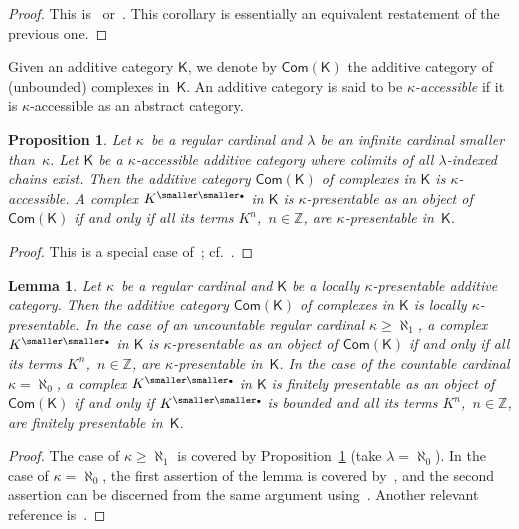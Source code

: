 \documentclass[12pt,a4paper]{amsart}
\newcommand{\+}{\protect\nobreakdash-}
\renewcommand{\:}{\colon}
\newcommand{\bu}{{\text{\smaller\smaller$\scriptstyle\bullet$}}}
\newcommand{\Com}{\mathsf{Com}}
\newcommand{\sK}{\mathsf K}
\newcommand{\boZ}{\mathbb Z}
\theoremstyle{plain}
\newtheorem{prop}[thm]{Proposition}
\newtheorem{lem}[thm]{Lemma}
\theoremstyle{definition}
\begin{document}
\begin{proof}
 This is~\cite[Remark~3.2(I), Theorem~3.8, Corollary~3.9, and
Remark~3.11(II)]{Ulm} or~\cite[Remark~5.2]{Pacc}.
 This corollary is essentially an equivalent restatement of
the previous one.
\end{proof}

 Given an additive category $\sK$, we denote by $\Com(\sK)$
the additive category of (unbounded) complexes in~$\sK$.
 An additive category is said to be \emph{$\kappa$\+accessible}
if it is $\kappa$\+accessible as an abstract category.

\begin{prop} \label{category-of-complexes-accessible-prop}
 Let\/ $\kappa$~be a regular cardinal and\/ $\lambda$ be an infinite
cardinal smaller than\/~$\kappa$.
 Let\/ $\sK$ be a\/ $\kappa$\+accessible additive category where
colimits of all\/ $\lambda$\+indexed chains exist.
 Then the additive category\/ $\Com(\sK)$ of complexes in\/ $\sK$ is\/
$\kappa$\+accessible.
 A complex $K^\bu$ in\/ $\sK$ is\/ $\kappa$\+presentable as an object
of\/ $\Com(\sK)$ if and only if all its terms $K^n$, \,$n\in\boZ$,
are\/ $\kappa$\+presentable in\/~$\sK$.
\end{prop}

\begin{proof}
 This is a special case of~\cite[Theorem~6.2]{Pacc};
cf.~\cite[proof of Corollary~10.4]{Pacc}.
\end{proof}

\begin{lem} \label{category-of-complexes-locally-presentable-lem}
 Let\/ $\kappa$~be a regular cardinal and\/ $\sK$ be a locally\/
$\kappa$\+presentable additive category.
 Then the additive category\/ $\Com(\sK)$ of complexes in\/ $\sK$ is
locally\/ $\kappa$\+presentable.
 In the case of an uncountable regular cardinal\/ $\kappa\ge\aleph_1$,
a complex $K^\bu$ in\/ $\sK$ is\/ $\kappa$\+presentable as an object
of\/ $\Com(\sK)$ if and only if all its terms $K^n$, \,$n\in\boZ$,
are\/ $\kappa$\+presentable in\/~$\sK$.
 In the case of the countable cardinal\/ $\kappa=\aleph_0$,
a complex $K^\bu$ in\/ $\sK$ is finitely presentable as an object
of\/ $\Com(\sK)$ if and only if $K^\bu$ \emph{is bounded and} all its
terms $K^n$, \,$n\in\boZ$, are finitely presentable in\/~$\sK$.
\end{lem}

\begin{proof}
 The case of $\kappa\ge\aleph_1$ is covered by
Proposition~\ref{category-of-complexes-accessible-prop}
(take $\lambda=\aleph_0$).
 In the case of $\kappa=\aleph_0$, the first assertion of
the lemma is covered by~\cite[Lemma~6.3]{PS4}, and the second
assertion can be discerned from the same argument
using~\cite[Lemma~A.3(2)]{Sto0}.
 Another relevant reference is~\cite[Theorem~1.2]{Hen}.
\end{proof}
\end{document}
